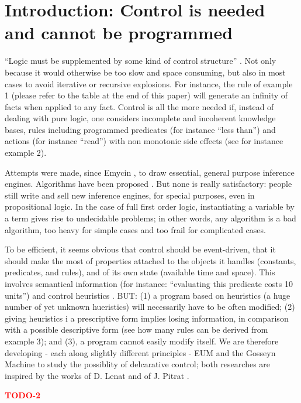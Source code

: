 \documentclass[11pt,a4paper,svgnames]{article}
\begin{document}
  \section{Introduction: Control is needed and cannot be programmed}
  \label{sec:intro}

  ``Logic must be supplemented by some kind of control structure''
  \cite{Simon-Search-1983}. Not only because it would otherwise be too slow and
  space consuming, but also in most cases to avoid iterative or recursive
  explosions. For instance, the rule of example 1 (please refer to the table at
  the end of this paper) will generate an infinity of facts when applied to any
  fact. Control is all the more needed if, instead of dealing with pure logic,
  one considers incomplete and incoherent knowledge bases, rules including
  programmed predicates (for instance ``less than'') and actions (for instance
  ``read'') with non monotonic side effects (see for instance example 2).

  Attempts were made, since Emycin \cite{}, to draw essential, general purpose
  inference engines. Algorithms have been proposed \cite{}. But none is really
  satisfactory: people still write and sell new inference engines, for special
  purposes, even in propositional logic. In the case of full first order logic,
  instantiating a variable by a term gives rise to undecidable problems; in
  other words, any algorithm is a bad algorithm, too heavy for simple cases and
  too frail for complicated cases.

  To be efficient, it seems obvious that control should be event-driven, that it
  should make the most of properties attached to the objects it handles
  (constants, predicates, and rules), and of its own state (available time and
  space). This involves semantical information (for instance: ``evaluating this
  predicate costs 10 units'') and control heuristics \cite{}. BUT: (1) a program
  based on heuristics (a huge number of yet unknown hueristics) will necessarily
  have to be often modified; (2) giving heuristics i a prescriptive form implies
  losing information, in comparison with a possible descriptive form (see how
  many rules can be derived from example 3); and (3), a program cannot easily
  modify itself. We are therefore developing - each along slightly different
  principles - EUM \cite{} and the Gosseyn Machine \cite{} to study the
  possiblity of delcarative control; both researches are inspired by the works
  of D. Lenat and of J. Pitrat \cite{}.

  {\textcolor{red}{\textbf{TODO-2}}}
\end{document}
